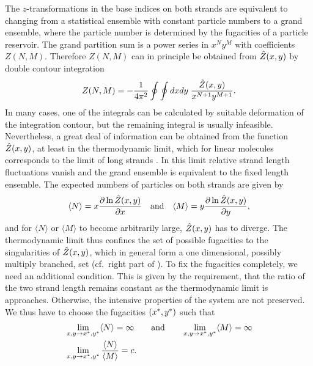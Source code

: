 The $z$-transformations in the base indices on both strands are equivalent to changing from a statistical 
ensemble with constant particle numbers to a grand ensemble, where the particle number is determined
by the fugacities of a particle reservoir. The grand partition sum is a power series in $x^{N}y^{M}$ with 
coefficients $Z(N,M)$. Therefore $Z(N,M)$ can in principle be obtained from $\hat{Z}(x,y)$ by double contour integration
\begin{equation}
\label{eq:contour_int}
   Z(N,M)=-\frac{1}{4\pi^{2}}\oint\oint dxdy\;\frac{\hat{Z}(x,y)}{x^{N+1}y^{M+1}}.
\end{equation}
In many cases, one of the integrals can be calculated by suitable deformation of the integration contour, but the
remaining integral is usually infeasible. Nevertheless, a great deal of information can be obtained from the 
function $\hat{Z}(x,y)$, at least in the thermodynamic limit, which for linear molecules corresponds to the 
limit of long strands \cite{Tamm_PRE_07}. In this limit relative strand length fluctuations vanish and the grand ensemble is equivalent to the fixed length ensemble. The expected numbers of particles on both strands are given by 
\begin{equation}
\label{eq:mean_length}
\begin{split}
  \langle N \rangle= x\frac{\partial \ln\hat{Z}(x,y)}{\partial x}\quad \mathrm{and}\quad
   \langle M \rangle= y\frac{\partial \ln\hat{Z}(x,y)}{\partial y},
\end{split}
\end{equation}
and for $\langle N \rangle$ or $\langle M \rangle$ to become arbitrarily large, $\hat{Z}(x,y)$ has to diverge. 
The thermodynamic limit
thus confines the set of possible fugacities to the singularities of $\hat{Z}(x,y)$, which in general 
form a one dimensional, possibly multiply branched, set (cf.~right part of ). 
To fix the fugacities completely, we need an additional condition. 
This is given by the requirement, that the ratio of the two strand length remains constant
as the thermodynamic limit is approaches. Otherwise, the intensive properties of the system 
are not preserved. We thus have to choose the fugacities $({x^*}, {y^*})$ such that
\begin{eqnarray}
\label{eq:partsum_divergence}
 \nonumber
  &\lim_{x,y\rightarrow {x^*},{y^*}}\langle N \rangle= \infty \qquad \mathrm{and}\qquad \lim_{x,y\rightarrow {x^*},{y^*}}\langle M \rangle= \infty\\
&\lim_{x,y\rightarrow {x^*},{y^*}}\frac{\langle N \rangle}{\langle M \rangle}=c. 
\end{eqnarray}
